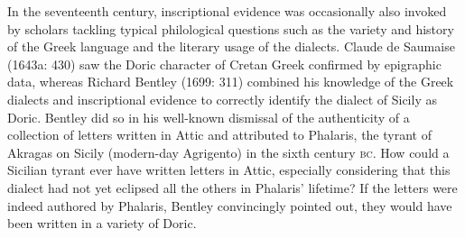 \begin{styleStandard}
In the seventeenth century, inscriptional evidence was occasionally also invoked by scholars tackling typical philological questions such as the variety and history of the Greek language and the literary usage of the dialects. Claude de Saumaise (1643a: 430) saw the Doric character of Cretan Greek confirmed by epigraphic data, whereas Richard Bentley (1699: 311) combined his knowledge of the Greek dialects and inscriptional evidence to correctly identify the dialect of Sicily as Doric. Bentley did so in his well-known dismissal of the authenticity of a collection of letters written in Attic and attributed to Phalaris, the tyrant of Akragas on Sicily (modern-day Agrigento) in the sixth century \textsc{bc}. How could a Sicilian tyrant ever have written letters in Attic, especially considering that this dialect had not yet eclipsed all the others in Phalaris’ lifetime? If the letters were indeed authored by Phalaris, Bentley convincingly pointed out, they would have been written in a variety of Doric.
\end{styleStandard}

